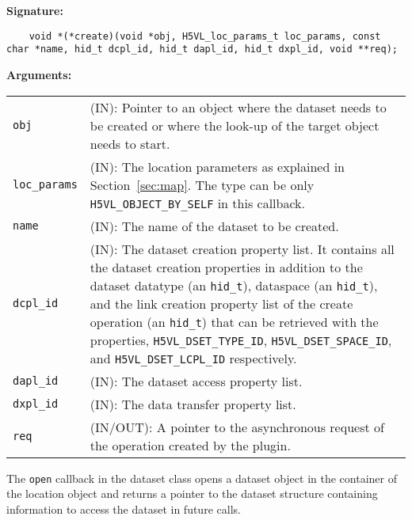 \begin{mdframed}[style=bgbox]
\textbf{Signature:}
\begin{lstlisting}
    void *(*create)(void *obj, H5VL_loc_params_t loc_params, const char *name, hid_t dcpl_id, hid_t dapl_id, hid_t dxpl_id, void **req);
\end{lstlisting}

\textbf{Arguments:}\\
\begin{tabular}{l p{13.5cm}}
  \texttt{obj} & (IN): Pointer to an object where the dataset needs
  to be created or where the look-up of the target object needs to
  start.\\
  \texttt{loc\_params} & (IN): The location parameters as explained in
  Section~\ref{sec:map}. The type can be only \texttt{H5VL\_OBJECT\_BY\_SELF} in this callback. \\
  \texttt{name} & (IN): The name of the dataset to be created.\\
  \texttt{dcpl\_id} & (IN): The dataset creation property list. It contains
  all the dataset creation properties in addition to the dataset
  datatype (an \texttt{hid\_t}), dataspace (an \texttt{hid\_t}), and the
  link creation property list of the create operation (an \texttt{hid\_t}) that can be retrieved with the properties, \texttt{H5VL\_DSET\_TYPE\_ID}, \texttt{H5VL\_DSET\_SPACE\_ID},  and \texttt{H5VL\_DSET\_LCPL\_ID} respectively.\\
  \texttt{dapl\_id} & (IN): The dataset access property list.\\
  \texttt{dxpl\_id} & (IN): The data transfer property list.\\
  \texttt{req} & (IN/OUT): A pointer to the asynchronous request of the
  operation created by the plugin.\\
\end{tabular}
\end{mdframed}

The \texttt{open} callback in the dataset class opens a dataset
object in the container of the location object and returns a pointer
to the dataset structure containing information to access the dataset
in future calls.\bigskip

